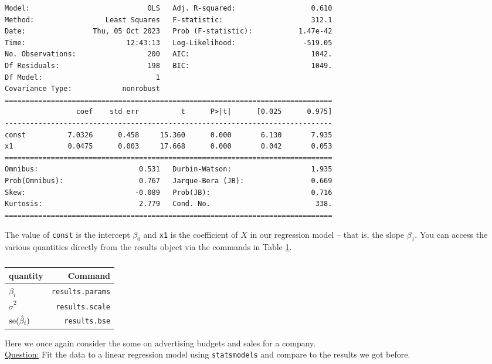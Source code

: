 \begin{itemize}
\begin{Verbatim}
Model:                            OLS   Adj. R-squared:                  0.610
Method:                 Least Squares   F-statistic:                     312.1
Date:                Thu, 05 Oct 2023   Prob (F-statistic):           1.47e-42
Time:                        12:43:13   Log-Likelihood:                -519.05
No. Observations:                 200   AIC:                             1042.
Df Residuals:                     198   BIC:                             1049.
Df Model:                           1                                         
Covariance Type:            nonrobust                                         
==============================================================================
                 coef    std err          t      P>|t|      [0.025      0.975]
------------------------------------------------------------------------------
const          7.0326      0.458     15.360      0.000       6.130       7.935
x1             0.0475      0.003     17.668      0.000       0.042       0.053
==============================================================================
Omnibus:                        0.531   Durbin-Watson:                   1.935
Prob(Omnibus):                  0.767   Jarque-Bera (JB):                0.669
Skew:                          -0.089   Prob(JB):                        0.716
Kurtosis:                       2.779   Cond. No.                         338.
==============================================================================
\end{Verbatim}
The value of \verb!const! is the intercept $\beta_0$ and \verb!x1! is the coefficient of $X$ in our regression model -- that is, the slope $\beta_1$. You can access the various quantities directly from the results object via the commands in Table \ref{tab:sm}.

\begin{table}[h]
\centering
\begin{tabular}{lr}
\textbf{quantity} & \textbf{Command}  \\
\hline
\hline
$\beta_i$ &  \verb!results.params! \\
$\hat{\sigma}^2$ &  \verb!results.scale! \\
${\rm se}(\hat{\beta}_i)$  & \verb!results.bse! \\
\end{tabular}
\caption{}
\label{tab:sm}
\end{table}



\begin{example}

Here we once again consider the some on advertising budgets and sales for a company.\\



\noindent
\underline{Question:} Fit the data to a linear regression model using \verb!statsmodels! and compare to the results we got before. \\ 


\end{example}
\end{itemize}

